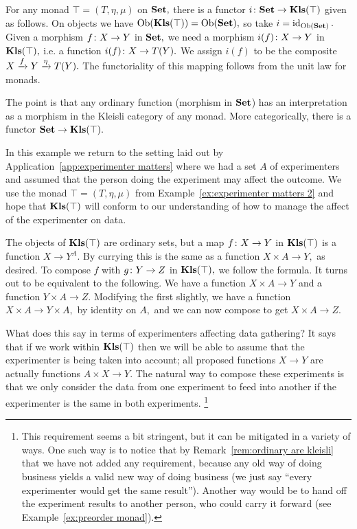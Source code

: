 \documentclass[../main/CT4S-EN-RU]{subfiles}
\begin{document}
\begin{exampleRUS}
\end{exampleRUS}

\begin{remarkENG}\label{rem:ordinary are kleisli}
For any monad $\top=(T,\eta,\mu)$ on ${\mathbf{Set}},$ there is a functor $i\colon {\mathbf{Set}}\rightarrow{\mathbf{Kls}}(\top)$ given as follows. On objects we have $\operatorname{Ob}({\mathbf{Kls}}(\top))=\operatorname{Ob}({\mathbf{Set}}),$ so take $i=\operatorname{id}_{\operatorname{Ob}({\mathbf{Set}})}.$ Given a morphism $f\colon X\rightarrow Y$ in ${\mathbf{Set}},$ we need a morphism $i(f)\colon X\rightarrow Y$ in ${\mathbf{Kls}}(\top),$ i.e. a function $i(f)\colon X\rightarrow T(Y).$ We assign $i(f)$ to be the composite $X\xrightarrow{f}Y\xrightarrow{\eta}T(Y).$ The functoriality of this mapping follows from the unit law for monads.

The point is that any ordinary function (morphism in ${\mathbf{Set}}$) has an interpretation as a morphism in the Kleisli category of any monad. More categorically, there is a functor ${\mathbf{Set}}\rightarrow{\mathbf{Kls}}(\top).$
\end{remarkENG}

\begin{remarkRUS}\label{rem:ordinary are kleisli}
\end{remarkRUS}

\begin{exampleENG}\label{ex:experimenter matters 3}
In this example we return to the setting laid out by Application~\ref{app:experimenter matters} where we had a set $A$ of experimenters and assumed that the person doing the experiment may affect the outcome. We use the monad $\top=(T,\eta,\mu)$ from Example~\ref{ex:experimenter matters 2} and hope that ${\mathbf{Kls}}(\top)$ will conform to our understanding of how to manage the affect of the experimenter on data.

The objects of ${\mathbf{Kls}}(\top)$ are ordinary sets, but a map $f\colon X\rightarrow Y$ in ${\mathbf{Kls}}(\top)$ is a function $X\to Y^A.$ By currying this is the same as a function $X\times A\to Y,$ as desired. To compose $f$ with $g\colon Y\rightarrow Z$ in ${\mathbf{Kls}}(\top),$ we follow the formula. It turns out to be equivalent to the following. We have a function $X\times A\to Y$ and a function $Y\times A\to Z.$ Modifying the first slightly, we have a function $X\times A\to Y\times A,$ by identity on $A,$ and we can now compose to get $X\times A\to Z.$

What does this say in terms of experimenters affecting data gathering? It says that if we work within ${\mathbf{Kls}}(\top)$ then we will be able to assume that the experimenter is being taken into account; all proposed functions $X\to Y$ are actually functions $A\times X\to Y.$ The natural way to compose these experiments is that we only consider the data from one experiment to feed into another if the experimenter is the same in both experiments.
\footnote{This requirement seems a bit stringent, but it can be mitigated in a variety of ways. One such way is to notice that by Remark~\ref{rem:ordinary are kleisli} that we have not added any requirement, because any old way of doing business yields a valid new way of doing business (we just say “every experimenter would get the same result”). Another way would be to hand off the experiment results to another person, who could carry it forward (see Example~\ref{ex:preorder monad}).}
\end{exampleENG}
\end{document}
